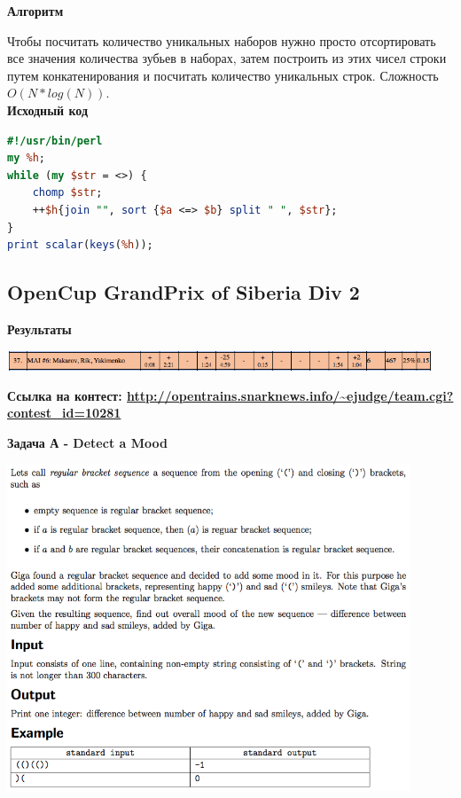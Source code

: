 \documentclass[a4paper,12pt]{article}
\begin{document}
\textbf{{\large Алгоритм}}

Чтобы посчитать количество уникальных наборов нужно просто отсортировать все значения количества зубьев в наборах, затем построить из этих чисел строки путем конкатенирования и посчитать количество уникальных строк. Сложность $O(N * log(N))$. \\

\textbf{{\large Исходный код}} \\
\begin{lstlisting}[language=Perl]
#!/usr/bin/perl
my %h;
while (my $str = <>) {
	chomp $str;
	++$h{join "", sort {$a <=> $b} split " ", $str};
}
print scalar(keys(%h));
\end{lstlisting}







%
%
\newpage
\subsection{OpenCup GrandPrix of Siberia Div 2}

\textbf{{\large Результаты}} \\
\begin{center}
\includegraphics[width=0.95\textwidth]{OC_Siberia/result.png}\\ [1cm]
\end{center}

\textbf{{\large Ссылка на контест: \url{http://opentrains.snarknews.info/~ejudge/team.cgi?contest_id=10281}}}

\newpage
\textbf{{\large Задача А - Detect a Mood}}

\begin{center}
\includegraphics[width=0.9\textwidth]{OC_Siberia/A.png}\\ [1cm]
\end{center}
\end{document}
